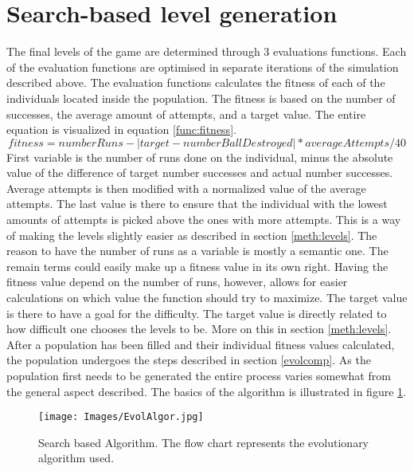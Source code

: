 \documentclass[a4paper,11pt]{article}
\begin{document}
\section{Search-based level generation}
\label{meth:levelgen}
The final levels of the game are determined through 3 evaluations functions. Each of the evaluation functions are optimised in separate iterations of the simulation described above.
The evaluation functions calculates the fitness of each of the individuals located inside the population. The fitness is based on the number of successes, the average amount of attempts, and a target value. The entire equation is visualized in equation \ref{func:fitness}.
\begin{equation}
	fitness = numberRuns-|target-numberBallDestroyed|*averageAttempts/40
	\label{func:fitness}
\end{equation}
First variable is the number of runs done on the individual, minus the absolute value of the difference of target number successes and actual number successes. Average attempts is then modified with a normalized value of the average attempts. The last value is there to ensure that the individual with the lowest amounts of attempts is picked above the ones with more attempts. This is a way of making the levels slightly easier as described in section \ref{meth:levels}. 
The reason to have the number of runs as a variable is mostly a semantic one. The remain terms could easily make up a fitness value in its own right. Having the fitness value depend on the number of runs, however, allows for easier calculations on which value the function should try to maximize.
The target value is there to have a goal for the difficulty. The target value is directly related to how difficult one chooses the levels to be. More on this in section \ref{meth:levels}.
After a population has been filled and their individual fitness values calculated, the population undergoes the steps described in section \ref{evolcomp}. As the population first needs to be generated the entire process varies somewhat from the general aspect described. The basics of the algorithm is illustrated in figure \ref{fig:EvolAlgor}.
\begin{figure}[h]
    \centering
    \texttt{[image: Images/EvolAlgor.jpg]}
    \caption{Search based Algorithm. The flow chart represents the evolutionary algorithm used.}
    \label{fig:EvolAlgor}
\end{figure}
\end{document}
